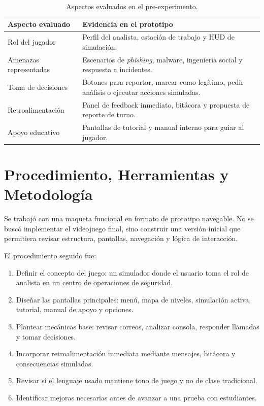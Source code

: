 ﻿\documentclass[12pt]{article}
\begin{document}
\begin{table}[h]
\centering
\begin{tabular}{|p{4cm}|p{9cm}|}
\hline
\textbf{Aspecto evaluado} & \textbf{Evidencia en el prototipo} \\ \hline
Rol del jugador & Perfil del analista, estaci\'{o}n de trabajo y HUD de simulaci\'{o}n. \\ \hline
Amenazas representadas & Escenarios de \textit{phishing}, malware, ingenier\'{i}a social y respuesta a incidentes. \\ \hline
Toma de decisiones & Botones para reportar, marcar como leg\'{i}timo, pedir an\'{a}lisis o ejecutar acciones simuladas. \\ \hline
Retroalimentaci\'{o}n & Panel de feedback inmediato, bit\'{a}cora y propuesta de reporte de turno. \\ \hline
Apoyo educativo & Pantallas de tutorial y manual interno para guiar al jugador. \\ \hline
\end{tabular}
\caption{Aspectos evaluados en el pre-experimento.}
\end{table}

\section{Procedimiento, Herramientas y Metodolog\'{i}a}

Se trabaj\'{o} con una maqueta funcional en formato de prototipo navegable. No se busc\'{o} implementar el videojuego final, sino construir una versi\'{o}n inicial que permitiera revisar estructura, pantallas, navegaci\'{o}n y l\'{o}gica de interacci\'{o}n.

El procedimiento seguido fue:

\begin{enumerate}
    \item Definir el concepto del juego: un simulador donde el usuario toma el rol de analista en un centro de operaciones de seguridad.
    \item Dise\~{n}ar las pantallas principales: men\'{u}, mapa de niveles, simulaci\'{o}n activa, tutorial, manual de apoyo y opciones.
    \item Plantear mec\'{a}nicas base: revisar correos, analizar consola, responder llamadas y tomar decisiones.
    \item Incorporar retroalimentaci\'{o}n inmediata mediante mensajes, bit\'{a}cora y consecuencias simuladas.
    \item Revisar si el lenguaje usado mantiene tono de juego y no de clase tradicional.
    \item Identificar mejoras necesarias antes de avanzar a una prueba con estudiantes.
\end{enumerate}
\end{document}
